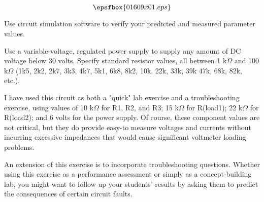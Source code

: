 

$$\epsfbox{01609x01.eps}$$

\vfil \eject






Use circuit simulation software to verify your predicted and measured parameter values.







Use a variable-voltage, regulated power supply to supply any amount of DC voltage below 30 volts.  Specify standard resistor values, all between 1 k$\Omega$ and 100 k$\Omega$ (1k5, 2k2, 2k7, 3k3, 4k7, 5k1, 6k8, 8k2, 10k, 22k, 33k, 39k 47k, 68k, 82k, etc.).

I have used this circuit as both a "quick" lab exercise and a troubleshooting exercise, using values of 10 k$\Omega$ for R1, R2, and R3; 15 k$\Omega$ for R(load1); 22 k$\Omega$ for R(load2); and 6 volts for the power supply.  Of course, these component values are not critical, but they do provide easy-to measure voltages and currents without incurring excessive impedances that would cause significant voltmeter loading problems.

An extension of this exercise is to incorporate troubleshooting questions.  Whether using this exercise as a performance assessment or simply as a concept-building lab, you might want to follow up your students' results by asking them to predict the consequences of certain circuit faults.




